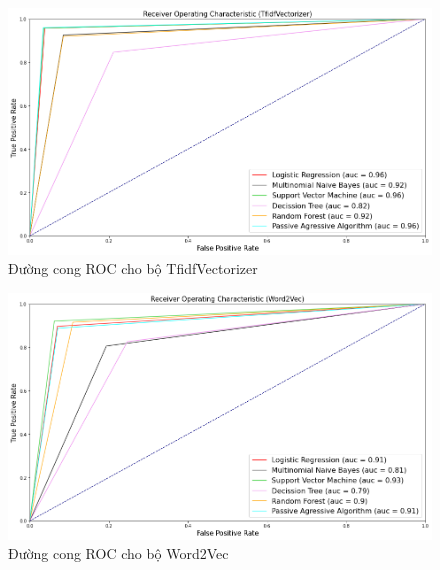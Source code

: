 \documentclass[12pt,a4paper,oneside]{book}
\begin{document}
	\begin{figure}[H]
		\includegraphics[width=1.03\textwidth]{tfroc}
		\caption{Đường cong ROC cho bộ TfidfVectorizer} 
	\end{figure}
	\hfill
	\begin{figure}[H]
		\includegraphics[width=1.03\textwidth]{w2vroc}
		\caption{Đường cong ROC cho bộ Word2Vec} 
	\end{figure}
	\pagebreak
\end{document}
